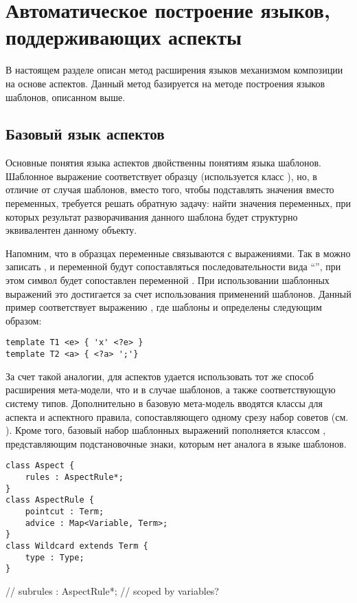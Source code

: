 \chapter{Автоматическое построение языков, поддерживающих аспекты}

В настоящем разделе описан метод расширения языков механизмом композиции на основе аспектов. Данный метод базируется на методе построения языков шаблонов, описанном выше.

\section{Базовый язык аспектов}

Основные понятия языка аспектов двойственны понятиям языка шаблонов.
Шаблонное выражение соответствует образцу (используется класс ), но, в отличие от случая шаблонов, вместо того, чтобы подставлять значения вместо переменных, требуется решать обратную задачу: найти значения переменных, при которых результат разворачивания данного шаблона будет структурно эквивалентен данному объекту. 

Напомним, что в образцах переменные связываются с выражениями. Так в \GRM{} можно записать , и переменной  будут сопоставляться последовательности вида ``'', при этом символ  будет сопоставлен переменной . При использовании шаблонных выражений это достигается за счет использования применений шаблонов. Данный пример соответствует выражению , где шаблоны  и  определены следующим образом:
\begin{lstlisting}
template T1 <e> { 'x' <?e> }
template T2 <a> { <?a> ';'}
\end{lstlisting}

За счет такой аналогии, для аспектов удается использовать тот же способ расширения мета-модели, что и в случае шаблонов, а также соответствующую систему типов. Дополнительно в базовую мета-модель вводятся классы для аспекта и аспектного правила, сопоставляющего одному срезу набор советов (см. ). Кроме того, базовый набор шаблонных выражений пополняется классом , представляющим подстановочные знаки, которым нет аналога в языке шаблонов.

\begin{lstlisting}[label=AspectMM,float=htbp,caption=Классы базовой мета-модели языка аспектов]
class Aspect {
	rules : AspectRule*;
}
class AspectRule {
	pointcut : Term;
	advice : Map<Variable, Term>;
}
class Wildcard extends Term {
	type : Type;
}
\end{lstlisting}
//	subrules : AspectRule*; // scoped by variables?

